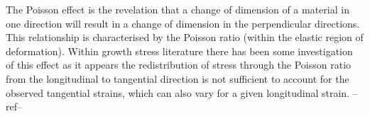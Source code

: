 The Poisson effect is the revelation that a change of dimension of a material
in one direction will result in a change of dimension in the perpendicular directions.
This relationship is characterised by the Poisson ratio (within the elastic
region of deformation). Within growth stress literature there has been some
investigation of this effect as it appears the redistribution of stress through
the Poisson ratio from the longitudinal to tangential direction is not
sufficient to account for the observed tangential strains, which can also vary
for a given longitudinal strain. --ref--